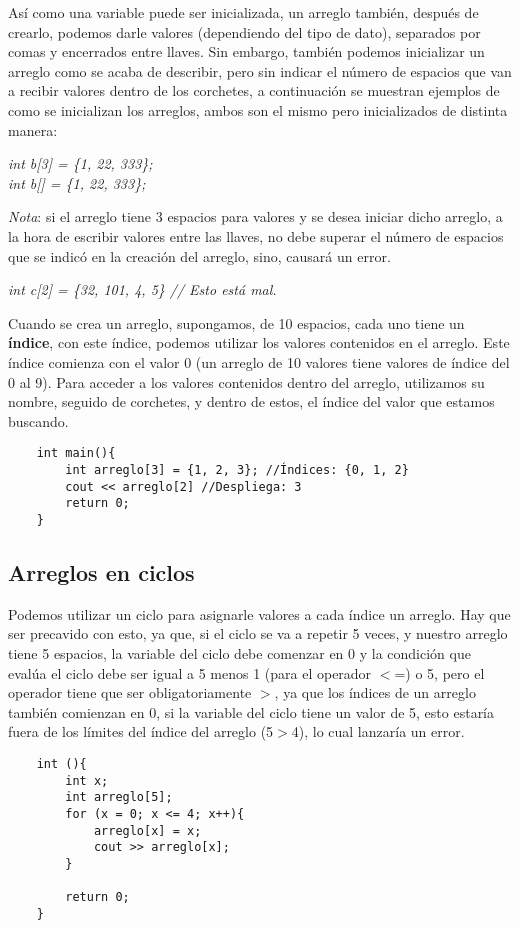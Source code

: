 Así como una variable puede ser inicializada, un arreglo también, después de crearlo, podemos darle valores (dependiendo del tipo de dato), separados por comas y encerrados entre llaves. Sin embargo, también podemos inicializar un arreglo como se acaba de describir, pero sin indicar el número de espacios que van a recibir valores dentro de los corchetes, a continuación se muestran ejemplos de como se inicializan los arreglos, ambos son el mismo pero inicializados de distinta manera:
\begin{center}
    \textit{
        int b[3] = \{1, 22, 333\}; \\
        int b[] = \{1, 22, 333\};
    }
\end{center}

\textit{Nota}: si el arreglo tiene 3 espacios para valores y se desea iniciar dicho arreglo, a la hora de escribir valores entre las llaves, no debe superar el número de espacios que se indicó en la creación del arreglo, sino, causará un error.
\begin{center}
    \textit{int c[2] = \{32, 101, 4, 5\} // Esto está mal.}
\end{center}

Cuando se crea un arreglo, supongamos, de 10 espacios, cada uno tiene un \textbf{índice}, con este índice, podemos utilizar los valores contenidos en el arreglo. Este índice comienza con el valor 0 (un arreglo de 10 valores tiene valores de índice del 0 al 9). Para acceder a los valores contenidos dentro del arreglo, utilizamos su nombre, seguido de corchetes, y dentro de estos, el índice del valor que estamos buscando.
\begin{lstlisting}
    int main(){
        int arreglo[3] = {1, 2, 3}; //Índices: {0, 1, 2}
        cout << arreglo[2] //Despliega: 3
        return 0;
    }
\end{lstlisting}


\subsection{Arreglos en ciclos}
\hspace{0.55cm}Podemos utilizar un ciclo para asignarle valores a cada índice un arreglo. Hay que ser precavido con esto, ya que, si el ciclo se va a repetir 5 veces, y nuestro arreglo tiene 5 espacios, la variable del ciclo debe comenzar en 0 y la condición que evalúa el ciclo debe ser igual a 5 menos 1 (para el operador $<$=) o 5, pero el operador tiene que ser obligatoriamente $>$, ya que los índices de un arreglo también comienzan en 0, si la variable del ciclo tiene un valor de 5, esto estaría fuera de los límites del índice del arreglo (5$>$4), lo cual lanzaría un error.
\begin{lstlisting}
    int (){
        int x;
        int arreglo[5];
        for (x = 0; x <= 4; x++){
            arreglo[x] = x;
            cout >> arreglo[x];
        }
        
        return 0;
    }
\end{lstlisting}



